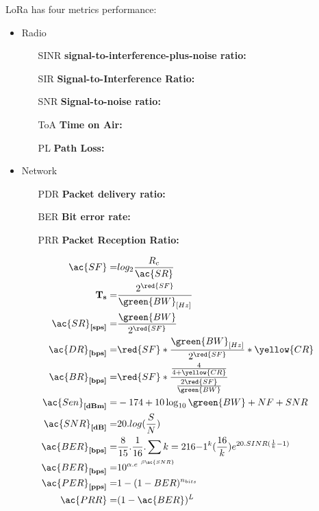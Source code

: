 LoRa has four metrics performance:

\begin{itemize}
	\item Radio
	\begin{itemize}
			\item[SINR] \textbf{signal-to-interference-plus-noise ratio:}
			\item[SIR] \textbf{Signal-to-Interference Ratio:}
			\item[SNR] \textbf{Signal-to-noise ratio:}
			\item[ToA] \textbf{Time on Air:}
			\item[PL] \textbf{Path Loss:}

	\end{itemize}
	\item Network
	\begin{itemize}
	\item[PDR] \textbf{Packet delivery ratio:}
	\item[BER] \textbf{Bit error rate:}
	\item[PRR] \textbf{Packet Reception Ratio:}
	\end{itemize}
\end{itemize}

\begin{align}
\ac{SF}                     =& log_{2} \frac{R_{c}}{\ac{SR}}\\
\textbf{T}_{\textbf{s}}     =& \frac{2^{\red{SF}}}{\green{BW}_{[Hz]}}\\
\ac{SR}_{\textbf{[sps]}}    =& \frac{\green{BW}}{2^{\red{SF}}}\\
\ac{DR}_{\textbf{[bps]}}    =& \red{SF}*\frac{\green{BW}_{[Hz]}}{2^{\red{SF}}}*\yellow{CR}\\
\ac{BR}_{\textbf{[bps]}}    =& \red{SF} * \frac{\frac{4}{4+\yellow{CR}}}{\frac{2 \red{SF}}{\green{BW}}}\\
\ac{Sen}_{\textbf{[dBm]}}   =& -174+10 \log _{10} \green{BW} + NF + SNR\\
\ac{SNR}_{\textbf{[dB]}}    =& 20.log(\frac{S}{N})\\
\ac{BER}_{\textbf{[bps]}}   =& \frac{8}{15}.\frac{1}{16}.\sum{k=2}{16}{-1^{k}(\frac{16}{k})e^{20.SINR(\frac{1}{k}-1)}}\\
\ac{BER}_{\textbf{[bps]}}   =& 10^{\alpha .e^{\ \beta \tiny\ac{SNR}}}\\
\ac{PER}_{\textbf{[pps]}}   =& 1-(1-BER)^{n_{bits}}\\
\ac{PRR}                    =& (1-\ac{BER})^{L}\\
\end{align}


